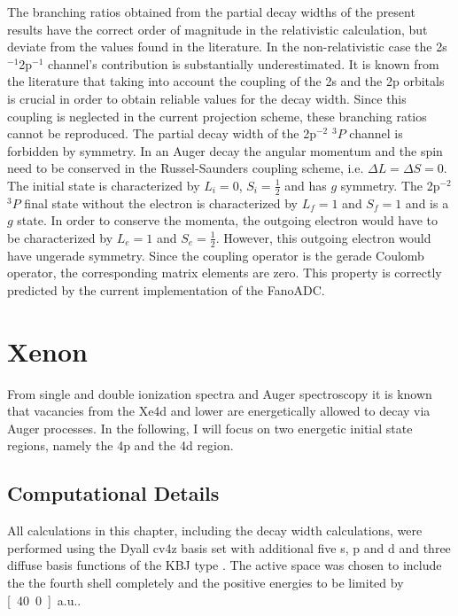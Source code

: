 The branching ratios obtained from the partial decay widths of the present
results have the correct order of magnitude in the relativistic calculation, but
deviate from the values found in the literature. In the non-relativistic case
the 2s$^{-1}$2p$^{-1}$ channel's contribution is substantially underestimated.
It is known from the literature \cite{Aaberg82} that taking into account
the coupling of the 2s and the 2p orbitals is crucial in order to obtain
reliable values for the decay width. Since this coupling is neglected
in the current projection scheme, these branching ratios cannot be reproduced.
The partial decay width of the 2p$^{-2}$ $^3P$ channel is forbidden by symmetry.
In an Auger decay the angular momentum and the spin need to be conserved
in the Russel-Saunders coupling scheme, i.e. $\Delta L = \Delta S = 0$.
The initial state is characterized by $L_i = 0$, $S_i= \frac12$ and
has $g$ symmetry. The
2p$^{-2}$ $^3P$ final state without the electron is characterized by $L_f=1$
and $S_f = 1$ and is a $g$ state. In order to conserve the momenta, the
outgoing electron would have to be characterized by $L_e=1$ and $S_e=\frac12$.
However, this outgoing electron would have ungerade symmetry. Since the coupling
operator is the gerade Coulomb operator, the corresponding matrix elements
are zero.
This property is correctly predicted by the current implementation of the
FanoADC.




\section{Xenon}
From single and double ionization spectra and Auger spectroscopy
it is known that vacancies from the Xe4d and lower are energetically allowed to
decay via Auger processes. \cite{Siegbahn69}
In the following, I will focus on two energetic initial state regions, namely
the 4p and the 4d region.

\subsection{Computational Details}
All calculations in this chapter, including the decay width calculations,
were performed using the
Dyall cv4z basis set \cite{dyall5p06} with additional five s, p and d
and three diffuse basis functions                       
of the \ac{KBJ} type \cite{Kaufmann89}. The active space was chosen to include the
the fourth shell completely and the positive energies to be limited by
\unit[40.0]{a.u.}.

